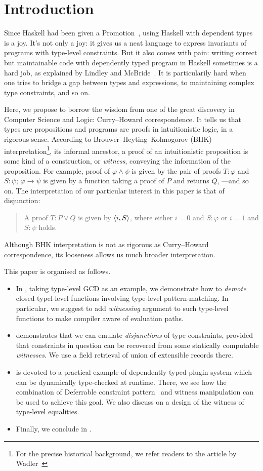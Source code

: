 \documentclass[demotion-paper.tex]{subfiles}
\begin{document}
\section{Introduction}
Since Haskell had been given a Promotion~\cite{Yorgey:2012}, using Haskell with dependent types is a joy.
It's not only a joy: it gives us a neat language to express invariants of programs with type-level constraints.
But it also comes with pain: writing correct but maintainable code with dependently typed program in Haskell sometimes is a hard job, as explained by Lindley and McBride~\cite{10.1145/2503778.2503786}.
It is particularily hard when one tries to bridge a gap between types and expressions, to maintaining complex type constraints, and so on.

Here, we propose to borrow the wisdom from one of the great discovery in Computer Science and Logic: Curry--Howard correspondence.
It tells us that types are propositions and programs are proofs in intuitionistic logic, in a rigorous sense.
According to Brouwer--Heyting--Kolmogorov (BHK) interpretation\footnote{For the precise historical background, we refer readers to the article by Wadler~\cite{Wadler:2015aa}}, its informal ancestor, a proof of an intuitionistic proposition is some kind of a construction, or \emph{witness}, conveying the information of the proposition.
For example, proof of $\varphi \land \psi$ is given by the pair of proofs $T: \varphi$ and $S: \psi$; $\varphi \to \psi$ is given by a function taking a proof of $P$ and returns $Q$, ---and so on.
The interpretation of our particular interest in this paper is that of disjunction:
\begin{quote}
  A proof $T: P \vee Q$ is given by $\braket{i, S}$, where either $i = 0$ and $S: \varphi$ or $i = 1$ and $S: \psi$ holds.
\end{quote}
Although BHK interpretation is not as rigorous as Curry--Howard correspondence, its looseness allows us much broader interpretation.

This paper is organised as follows.
\begin{itemize}
  \item In , taking type-level GCD as an example, we demonstrate how to \emph{demote} closed typel-level functions involving type-level pattern-matching.
  In particular, we suggest to add \emph{witnessing} argument to such type-level functions to make compiler aware of evaluation paths.
  \item {} demonstrates that we can emulate \emph{disjunctions} of type constraints, provided that constraints in question can be recovered from some statically computable \emph{witnesses}.
  We use a field retrieval of union of extensible records there.
  \item {} is devoted to a practical example of dependently-typed plugin system which can be dynamically type-checked at runtime.
  There, we see how the combination of Deferrable constraint pattern~\cite{Kmett:2020ab} and witness manipulation can be used to achieve this goal.
  We also discuss on a design of the witness of type-level equalities.
  \item Finally, we conclude in .
\end{itemize}
\end{document}
